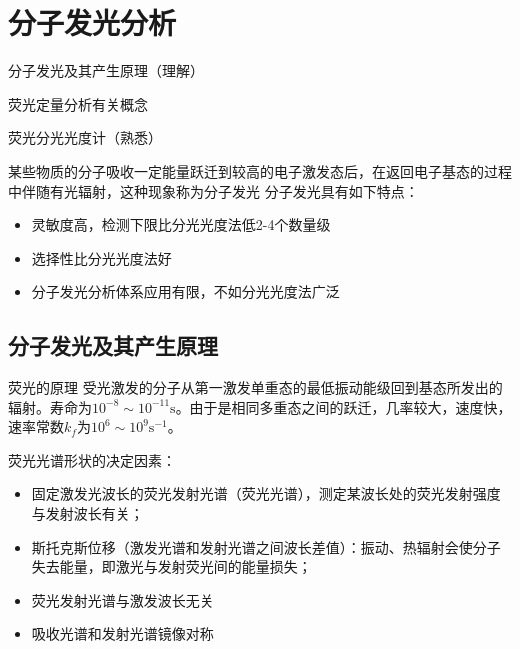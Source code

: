 \chapter{分子发光分析}

\begin{introduction}
	\item 分子发光及其产生原理（理解）
	\item 荧光定量分析有关概念
	\item 荧光分光光度计（熟悉）
\end{introduction}


某些物质的分子吸收一定能量跃迁到较高的电子激发态后，在返回电子基态的过程中伴随有光辐射，这种现象称为分子发光
分子发光具有如下特点：
\begin{itemize}
	\item 灵敏度高，检测下限比分光光度法低2-4个数量级
	\item 选择性比分光光度法好
	\item 分子发光分析体系应用有限，不如分光光度法广泛
\end{itemize}
\section{分子发光及其产生原理}

\begin{definition*}{荧光的原理}
	受光激发的分子从第一激发单重态的最低振动能级回到基态所发出的辐射。寿命为$10^{-8} \sim 10^{-11}\mathrm{s}$。由于是相同多重态之间的跃迁，几率较大，速度快，速率常数$k_f$为$10^{6}\sim 10^{9} \mathrm{s}^{-1}$。
\end{definition*}
荧光光谱形状的决定因素：
\begin{itemize}
	\item 固定激发光波长的荧光发射光谱（荧光光谱），测定某波长处的荧光发射强度与发射波长有关；
	\item 斯托克斯位移（激发光谱和发射光谱之间波长差值）：振动、热辐射会使分子失去能量，即激光与发射荧光间的能量损失；
	\item 荧光发射光谱与激发波长无关
	\item 吸收光谱和发射光谱镜像对称
\end{itemize}

